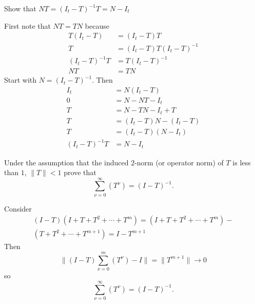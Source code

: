 \documentclass[12pt]{article}
\begin{document}
\begin{exercise}
    Show that \( NT = (I_t - T)^{-1} T = N - I_t \)
\end{exercise}
\begin{solution}
  First note that \( NT = TN \) because
  \begin{align*}
    T (I_t - T) &= (I_t -T)T \\
    T &= (I_t - T) T (I_t - T)^{-1} \\
    (I_t - T)^{-1} T &= T (I_t - T)^{-1} \\
    NT &= TN
  \end{align*}
    Start with \( N = (I_t-T)^{-1} \).  Then
    \begin{align*}
        I_t &= N(I_t-T) \\
        0 &= N - NT - I_t \\
        T &= N - TN - I_t + T \\
        T &= (I_t - T) N - (I_t - T) \\
        T &= (I_t-T)(N - I_t) \\
        (I_t - T)^{-1} T &= N - I_t
    \end{align*}
\end{solution}

\begin{exercise}
    Under the assumption that the induced \( 2 \)-norm (or operator norm)
    of \( T \) is less than \( 1 \), \( \| T \| < 1 \) prove that
    \[
        \sum_{\nu=0}^{\infty} (T^\nu) = (I - T)^{-1}.
    \]

\end{exercise}
\begin{solution}
    Consider
    \begin{multline*}
        (I-T)(I + T + T^2 + \cdots + T^m) = (I + T + T^2 + \cdots + T^m)
        - \\
        (T + T^2 + \cdots + T^{m+1}) = I - T^{m+1}
    \end{multline*}
    Then
    \[
        \| (I-T) \sum_{\nu=0}^{m} (T^\nu) - I \| = \| T^{m+1} \| \to 0
    \] so
    \[
        \sum_{\nu=0}^{\infty} (T^\nu) = (I - T)^{-1}.
    \]
\end{solution}
\end{document}
